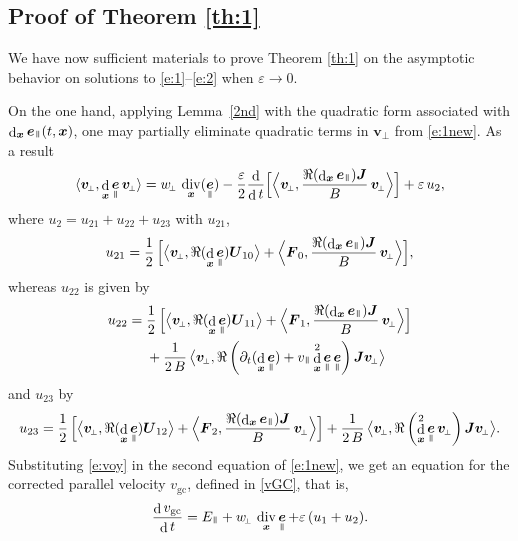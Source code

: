 \documentclass[JEP,XML,SOM,Unicode]{cedram}
\newcommand{\sperp}{{\scriptscriptstyle\perp}}
\newcommand{\blangle}{\bigl\langle}
\newcommand{\brangle}{\bigr\rangle}
\newcommand{\Blangle}{\Bigl\langle}
\newcommand{\Brangle}{\Bigr\rangle}
\let\eps\varepsilon
\let\d\partial
\DeclareMathOperator\dD{d}\let\dd\dD
\DeclareMathOperator{\Div}{div}
\theoremstyle{plain}
\theoremstyle{definition}
\newcommand{\be}{\begin{equation}}
\newcommand{\ee}{\end{equation}}
\newcommand\bF{{\boldsymbol F}}
\newcommand\bJ{{\boldsymbol J}}
\newcommand\bU{{\boldsymbol U}}
\newcommand\bfv{{\boldsymbol v}}
\newcommand\bfx{{\boldsymbol x}}
\DeclareMathOperator{\beD}{\boldsymbol{e}}
\newcommand\eDpar{\beD_\mypar}
\newcommand\vpar{v_\mypar}
\newcommand\bvperp{\bfv_{\!\sperp}}
\newcommand\eperp{w_{\!\sperp}}
\newcommand\Epar{E_\mypar}
\newcommand{\vGC}{v_\mathrm{gc}}
\newcommand{\mypar}{{\mkern3mu\vphantom{\perp}\vrule depth 0pt\mkern2mu\vrule depth 0pt\mkern3mu}}
\begin{document}
\subsection{Proof of Theorem \ref{th:1}}
\label{sec:proofTh1}

We have now sufficient materials to prove Theorem \ref{th:1} on the
asymptotic behavior on solutions to \eqref{e:1}--\eqref{e:2} when $\eps\rightarrow 0$.

On the one hand, applying Lemma~\ref{2nd} with the quadratic form associated with $\dD_\bfx \eDpar(t,\bfx)$, one may partially eliminate quadratic terms in $\bvperp$ from \eqref{e:1new}. As a result
\be
\label{e:voy}
\langle\bvperp, \dD_\bfx \eDpar\bvperp\rangle
=\eperp\, \Div_\bfx(\eDpar)
-\frac{\eps}{2}\frac{\dD}{\dD t}\Bigl[\Blangle \bvperp,\frac{\Re(\dD_\bfx\eDpar)\bJ}{B}\,\bvperp\Brangle\Bigr]
+\eps\, u_2,
\ee
where $u_2 =u_{21}+u_{22}+u_{23}$ with $u_{21}$,
\[
u_{21}
=\frac{1}{2} \,\Bigl[ \blangle \bvperp, \Re(\dD_\bfx
\eDpar)\bU_{10}\brangle + \Blangle
\bF_0,\frac{\Re(\dD_\bfx \eDpar)\bJ}{B}\,\bvperp\Brangle
\Bigr],
\]
whereas $u_{22}$ is given by
\begin{align*}
 u_{22}={}& \frac{1}{2} \,\Bigl[ \blangle \bvperp, \Re(\dD_\bfx \eDpar)\bU_{11}\brangle
+\Blangle \bF_1,
\frac{\Re(\dD_\bfx\eDpar)\bJ}{B}\,\bvperp\Brangle \Bigr]
\\
&+\frac{1}{2 \,B} \,\blangle \bvperp,
{\Re\left(\d_t(\dD_\bfx\eDpar)+\vpar\dD_\bfx^2 \eDpar\eDpar\right)\bJ}\bvperp \brangle
\end{align*}
and $u_{23}$ by
\[
u_{23}= \frac{1}{2} \,\Bigl[ \blangle \bvperp, \Re(\dD_\bfx \eDpar)\bU_{12}\brangle
+\Blangle \bF_2,
\frac{\Re(\dD_\bfx\eDpar)\bJ}{B}\,\bvperp\Brangle \Bigr]
+\frac{1}{2\,B} \,\blangle \bvperp,
{\Re\left(\dD_\bfx^2 \eDpar\bvperp\right)\bJ}\bvperp \brangle.
\]
Substituting \eqref{e:voy} in the second equation of \eqref{e:1new},
we get an equation for the corrected parallel velocity $\vGC$, defined in \eqref{vGC}, that is,
\be
\label{vp:2}
\frac{\dD\vGC }{\dD t} =\Epar+\eperp\, \Div_\bfx\eDpar+\eps\,(u_1 +u_2).
\ee
\end{document}

